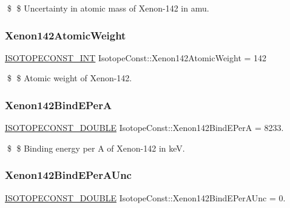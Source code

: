 \$ \$ Uncertainty in atomic mass of Xenon-\/142 in amu. \mbox{\label{group___isotope_const-_xenon-_xe142_gaebc248ca1134bc46db9733e1f717b6a9}} 
\subsubsection{\texorpdfstring{Xenon142\+Atomic\+Weight}{Xenon142AtomicWeight}}
{\footnotesize\ttfamily \mbox{\hyperlink{group___isotope_const-_macros_ga5f18360b3e99483a35c32d789e62621c}{I\+S\+O\+T\+O\+P\+E\+C\+O\+N\+S\+T\+\_\+\+I\+NT}} Isotope\+Const\+::\+Xenon142\+Atomic\+Weight = 142}

\$ \$ Atomic weight of Xenon-\/142. \mbox{\label{group___isotope_const-_xenon-_xe142_gae1b1b479a4f1560270d84c8257cb3684}} 
\subsubsection{\texorpdfstring{Xenon142\+Bind\+E\+PerA}{Xenon142BindEPerA}}
{\footnotesize\ttfamily \mbox{\hyperlink{group___isotope_const-_macros_ga8f45a7272ce02c0b4c65c44636ed719a}{I\+S\+O\+T\+O\+P\+E\+C\+O\+N\+S\+T\+\_\+\+D\+O\+U\+B\+LE}} Isotope\+Const\+::\+Xenon142\+Bind\+E\+PerA = 8233.}

\$ \$ Binding energy per A of Xenon-\/142 in keV. \mbox{\label{group___isotope_const-_xenon-_xe142_ga25fa64481267494266da3c71220abc0d}} 
\subsubsection{\texorpdfstring{Xenon142\+Bind\+E\+Per\+A\+Unc}{Xenon142BindEPerAUnc}}
{\footnotesize\ttfamily \mbox{\hyperlink{group___isotope_const-_macros_ga8f45a7272ce02c0b4c65c44636ed719a}{I\+S\+O\+T\+O\+P\+E\+C\+O\+N\+S\+T\+\_\+\+D\+O\+U\+B\+LE}} Isotope\+Const\+::\+Xenon142\+Bind\+E\+Per\+A\+Unc = 0.}

